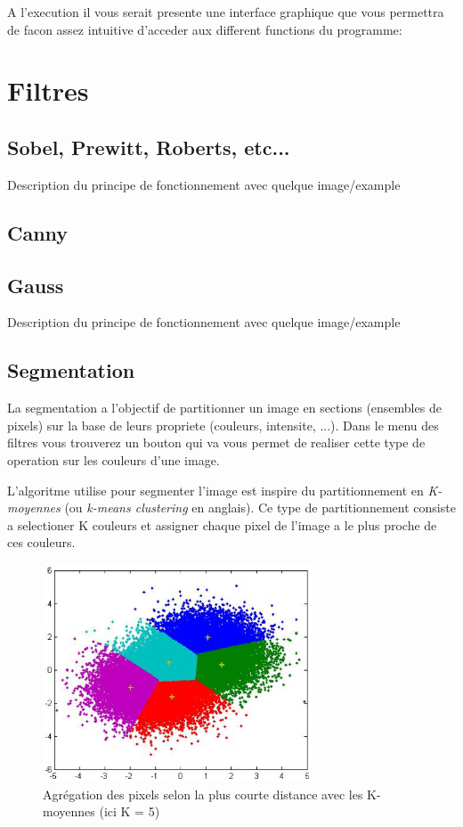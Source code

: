 \documentclass[twoside,openright,a4paper,11pt,french]{article}
\begin{document}
\vspace{1cm}
A l'execution il vous serait presente une interface graphique que vous
permettra de facon assez intuitive d'acceder aux different functions
du programme:

\begin{center}
\end{center}

\newpage 
\section{Filtres}
\subsection{Sobel, Prewitt, Roberts, etc...}
Description du principe de fonctionnement avec quelque image/example

\subsection{Canny}

\subsection{Gauss}
Description du principe de fonctionnement avec quelque image/example

\subsection{Segmentation}
La segmentation a l'objectif de partitionner un image en sections
(ensembles de pixels) sur la base de leurs propriete (couleurs,
intensite, ...). Dans le menu des filtres vous trouverez un bouton qui
va vous permet de realiser cette type de operation sur les couleurs
d'une image. 

L'algoritme utilise pour segmenter l'image est inspire du
partitionnement en {\it K-moyennes} (ou {\it k-means clustering} en
anglais). Ce type de partitionnement consiste a selectioner K couleurs
et assigner chaque pixel de l'image a le plus proche de ces couleurs.

\begin{figure}[h]
\centering
\includegraphics[width=8cm]{./pics/kmeans.eps}
\caption{Agrégation des pixels selon la plus courte distance avec les
K-moyennes (ici K = 5)}
\label{fig:routcidr}
\end{figure}
\end{document}
